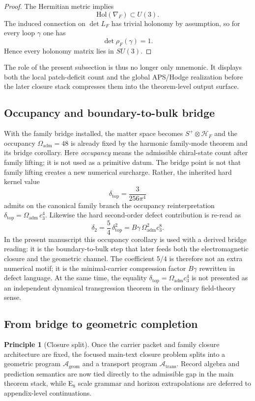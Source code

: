 \documentclass[11pt,a4paper]{article}
\theoremstyle{definition}
\newtheorem{principle}[theorem]{Principle}
\theoremstyle{remark}
\newcommand{\cthree}{c_3}
\newcommand{\deltatop}{\delta_{\mathrm{top}}}
\newcommand{\Oadm}{\Omega_{\mathrm{adm}}}
\newcommand{\Ageom}{\mathcal A_{\mathrm{geom}}}
\newcommand{\Atrans}{\mathcal A_{\mathrm{trans}}}
\begin{document}
\begin{proof}
The Hermitian metric implies
\[
\mathrm{Hol}(\nabla_F)\subset U(3).
\]
The induced connection on $\det L_F$ has trivial holonomy by assumption, so for
every loop $\gamma$ one has
\[
\det \rho_F(\gamma)=1.
\]
Hence every holonomy matrix lies in $SU(3)$.
\end{proof}

The role of the present subsection is thus no longer only mnemonic. It displays both the local patch-deficit count and the global APS/Hodge realization before the later closure stack compresses them into the theorem-level output surface.

\subsection{Occupancy and boundary-to-bulk bridge}

With the family bridge installed, the matter space becomes $S^+\otimes \mathcal H_F$ and the
occupancy $\Oadm=48$ is already fixed by the harmonic family-mode theorem and its bridge
corollary. Here \emph{occupancy} means the admissible chiral-state count after family lifting; it
is not used as a primitive datum. The bridge point is not that family lifting creates a new
numerical surcharge. Rather, the inherited hard kernel value
\[
\deltatop=\frac{3}{256\pi^4}
\]
admits on the canonical family branch the occupancy reinterpretation $\deltatop=\Oadm\,\cthree^4$.
Likewise the hard second-order defect contribution is re-read as
\[
\delta_2=\frac54\,\deltatop^2=B\gamma\,\Oadm^2\cthree^8.
\]
In the present manuscript this occupancy corollary is used with a derived bridge reading:
it is the boundary-to-bulk step that later feeds both the electromagnetic closure and the
geometric channel. The coefficient $5/4$ is therefore not an extra numerical motif; it is the
minimal-carrier compression factor $B\gamma$ rewritten in defect language. At the same time, the
equality $\deltatop=\Oadm\cthree^4$ is not presented as an independent dynamical transgression
theorem in the ordinary field-theory sense.

\subsection{From bridge to geometric completion}

\begin{principle}[Closure split]
Once the carrier packet and family closure architecture are fixed, the focused main-text closure
problem splits into a geometric program $\Ageom$ and a transport program $\Atrans$. Record
algebra and prediction semantics are now tied directly to the admissible gap in the main theorem
stack, while E$_8$ scale grammar and horizon extrapolations are deferred to appendix-level
continuations.
\end{principle}
\end{document}
